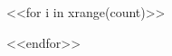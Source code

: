 \documentclass[11pt]{article}
\begin{document}
<<for i in xrange(count)>>
  
<<endfor>>
\end{document}
